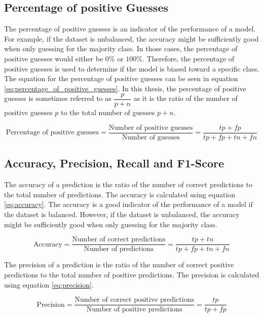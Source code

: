 \subsection{Percentage of positive Guesses}

The percentage of positive guesses is an indicator of the performance of a model. For example, if the dataset is unbalanced, the accuracy might be sufficiently good when only guessing for the majority class. In those cases, the percentage of positive guesses would either be $0\%$ or $100\%$. Therefore, the percentage of positive guesses is used to determine if the model is biased toward a specific class. The equation for the percentage of positive guesses can be seen in equation \ref{eq:percentage_of_positive_guesses}. In this thesis, the percentage of positive guesses is sometimes referred to as $\dfrac{p}{p + n}$ as it is the ratio of the number of positive guesses $p$ to the total number of guesses $p + n$.

\begin{equation}
    \label{eq:percentage_of_positive_guesses}
    \text{Percentage of positive guesses} = \frac{\text{Number of positive guesses}}{\text{Number of guesses}} = \frac{tp + fp}{tp + fp + tn + fn}
\end{equation}

\subsection{Accuracy, Precision, Recall and F1-Score}

The accuracy of a prediction is the ratio of the number of correct predictions to the total number of predictions. The accuracy is calculated using equation \ref{eq:accuracy}. The accuracy is a good indicator of the performance of a model if the dataset is balanced. However, if the dataset is unbalanced, the accuracy might be sufficiently good when only guessing for the majority class. 

\begin{equation}
    \label{eq:accuracy}
    \text{Accuracy} = \frac{\text{Number of correct predictions}}{\text{Number of predictions}} = \frac{tp + tn}{tp + fp + tn + fn}
\end{equation}

The precision of a prediction is the ratio of the number of correct positive predictions to the total number of positive predictions. The precision is calculated using equation \ref{eq:precision}.

\begin{equation}
    \label{eq:precision}
    \text{Precision} = \frac{\text{Number of correct positive predictions}}{\text{Number of positive predictions}} = \frac{tp}{tp + fp}
\end{equation}

